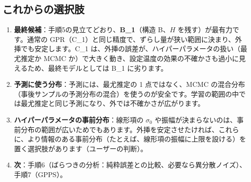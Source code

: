 \documentclass[paper=a4paper,fontsize=10.5pt,line_length=44zw,number_of_lines=38]{jlreq}
\begin{document}
\subsection{これからの選択肢}
\begin{enumerate}[itemsep=0.6ex,topsep=0.6ex]
\item \textbf{最終候補}：手順5の見立てどおり、\textbf{B\_1}（構造 B、$H$ を残す）が最有力です。通常の GPR（C\_1）と同じ精度で、ずらし量が狭い範囲に決まり、外挿でも安定します。C\_1 は、外挿の誤差が、ハイパーパラメータの扱い（最尤推定か MCMC か）で大きく動き、設定温度の効果の不確かさも過小に見えるため、最終モデルとしては B\_1 に劣ります。
\item \textbf{予測に使う分布}：予測には、最尤推定の 1 点ではなく、MCMC の混合分布（事後サンプルの予測分布の混合）を使うのが安全です。学習の範囲の中では最尤推定と同じ予測になり、外では不確かさが広がります。
\item \textbf{ハイパーパラメータの事前分布}：線形項の $\sigma_0$ や振幅が決まらないのは、事前分布の範囲が広いためでもあります。外挿を安定させたければ、これらに、より情報のある事前分布（たとえば、線形項の振幅に上限を設ける）を置く選択肢があります（ユーザーの判断）。
\item \textbf{次}：手順6（ばらつきの分析：純粋誤差との比較、必要なら異分散ノイズ）、手順7（GPPS）。
\end{enumerate}
\end{document}
